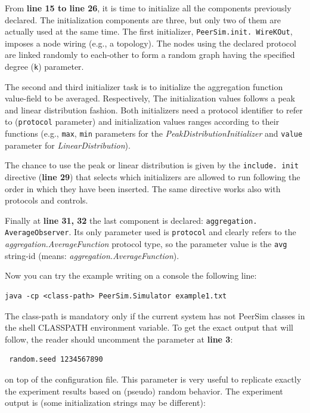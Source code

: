\documentclass[a4paper,11pt]{article}
\begin{document}
From \textbf{line 15 to line 26}, it is time to initialize all the
components previously declared. The initialization components
are three, but only two of them are actually used at the same
time. The first initializer, \texttt{PeerSim.init. WireKOut},
imposes a node wiring (e.g., a topology). The nodes using the declared
protocol are linked
randomly to each-other to form a random graph having the specified
degree (\texttt{k}) parameter. 

The second and third initializer task is to initialize the aggregation
function value-field to be averaged. Respectively, The initialization
values follows a peak and linear
distribution fashion. Both initializers need a protocol identifier to
refer to (\texttt{protocol} parameter) and initialization values
ranges according to their functions (e.g., \texttt{max}, \texttt{min}
parameters 
for the \emph{PeakDistributionInitializer} and \texttt{value}
parameter for \emph{LinearDistribution}). 

The chance to use the peak or linear distribution is given by the
\texttt{include. init} directive (\textbf{line 29}) that selects which
initializers are 
allowed to run following the order in which they have been
inserted. The same directive works also with protocols and controls.

Finally at \textbf{line 31, 32} the last component is declared:
\texttt{aggregation. AverageObserver}. Its only parameter used is \texttt{protocol} and clearly refers to the
\emph{aggregation.AverageFunction} protocol type, so the parameter
value is the \texttt{avg} string-id (means: \emph{aggregation.AverageFunction}). 

Now you can try the example writing on a console the following line:

\begin{verbatim}
java -cp <class-path> PeerSim.Simulator example1.txt \end{verbatim}

The class-path is mandatory only if the current system has not PeerSim
classes in the shell CLASSPATH environment variable. To get the exact
output that will follow, the reader should uncomment the parameter
at \textbf{line 3}:

\begin{verbatim} random.seed 1234567890 \end{verbatim}

on top of the configuration file. This parameter is very useful to
replicate exactly the experiment results based on (pseudo) random
behavior. The experiment output is (some initialization strings may
be different):
\end{document}

